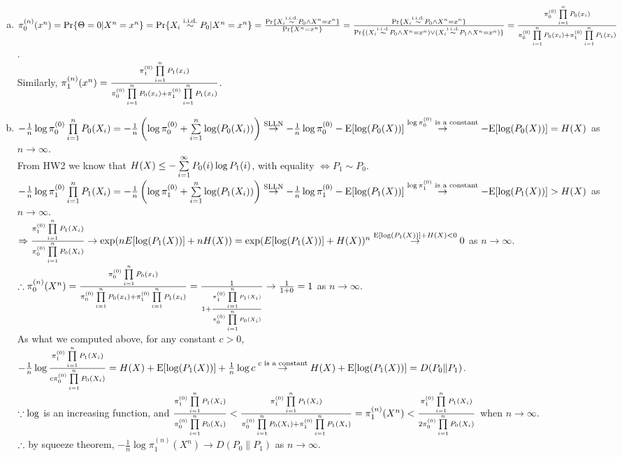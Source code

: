 \begin{pr}$ $
\begin{enumerate}[(a)]
\item $\pi_0^{(n)}(x^n)=\mathrm{Pr}\{\Theta=0|X^n=x^n\}=\mathrm{Pr}\{X_i\overset{\text{i.i.d.}}\sim P_0|X^n=x^n\}=\frac{\mathrm{Pr}\{X_i\overset{\text{i.i.d.}}\sim P_0\land X^n=x^n\}}{\mathrm{Pr}\{X^n=x^n\}}=\frac{\mathrm{Pr}\{X_i\overset{\text{i.i.d.}}\sim P_0\land X^n=x^n\}}{\mathrm{Pr}\{(X_i\overset{\text{i.i.d.}}\sim P_0\land X^n=x^n)\lor(X_i\overset{\text{i.i.d.}}\sim P_1\land X^n=x^n)\}}=\frac{\pi_0^{(0)}\prod\limits_{i=1}^nP_0(x_i)}{\pi_0^{(0)}\prod\limits_{i=1}^nP_0(x_i)+\pi_1^{(0)}\prod\limits_{i=1}^nP_1(x_i)}$.\\
Similarly, $\pi_1^{(n)}(x^n)=\frac{\pi_1^{(0)}\prod\limits_{i=1}^nP_1(x_i)}{\pi_0^{(0)}\prod\limits_{i=1}^nP_0(x_i)+\pi_1^{(0)}\prod\limits_{i=1}^nP_1(x_i)}$.
\item $-\frac1n\log\pi_0^{(0)}\prod\limits_{i=1}^nP_0(X_i)=-\frac1n\left(\log\pi_0^{(0)}+\sum\limits_{i=1}^n\log(P_0(X_i))\right)\overset{\text{SLLN}}\to-\frac1n\log\pi_0^{(0)}-\mathrm{E}[\log(P_0(X))]\overset{\log\pi_0^{(0)}\text{ is a constant}}\to-\mathrm{E}[\log(P_0(X))]=H(X)$ as $n\to\infty$.\\
From HW2 we know that $H(X)\leq-\sum\limits_{i=1}^\infty P_0(i)\log P_1(i)$, with equality $\iff P_1\sim P_0$.\\
$-\frac1n\log\pi_1^{(0)}\prod\limits_{i=1}^nP_1(X_i)=-\frac1n\left(\log\pi_1^{(0)}+\sum\limits_{i=1}^n\log(P_1(X_i))\right)\overset{\text{SLLN}}\to-\frac1n\log\pi_1^{(0)}-\mathrm{E}[\log(P_1(X))]\overset{\log\pi_1^{(0)}\text{ is a constant}}\to-\mathrm{E}[\log(P_1(X))]>H(X)$ as $n\to\infty$.\\
$\Rightarrow\frac{\pi_1^{(0)}\prod\limits_{i=1}^nP_1(X_i)}{\pi_0^{(0)}\prod\limits_{i=1}^nP_0(X_i)}\to\exp(nE[\log(P_1(X))]+nH(X))=\exp(E[\log(P_1(X))]+H(X))^n\overset{\mathrm{E}[\log(P_1(X))]+H(X)<0}\to0$ as $n\to\infty$.\\
$\therefore\pi_0^{(n)}(X^n)=\frac{\pi_0^{(0)}\prod\limits_{i=1}^nP_0(x_i)}{\pi_0^{(0)}\prod\limits_{i=1}^nP_0(x_i)+\pi_1^{(0)}\prod\limits_{i=1}^nP_1(x_i)}=\frac1{1+\frac{\pi_1^{(0)}\prod\limits_{i=1}^nP_1(X_i)}{\pi_0^{(0)}\prod\limits_{i=1}^nP_0(X_i)}}\to\frac1{1+0}=1$ as $n\to\infty$.\\
As what we computed above, for any constant $c>0$, $-\frac1n\log\frac{\pi_1^{(0)}\prod\limits_{i=1}^nP_1(X_i)}{c\pi_0^{(0)}\prod\limits_{i=1}^nP_0(X_i)}\\
=H(X)+\mathrm{E}[\log(P_1(X))]+\frac1n\log c\overset{c\text{ is a constant}}\to H(X)+\mathrm{E}[\log(P_1(X))]=D(P_0\|P_1)$.\\
$\because\log$ is an increasing function, and $\frac{\pi_1^{(0)}\prod\limits_{i=1}^nP_1(X_i)}{\pi_0^{(0)}\prod\limits_{i=1}^nP_0(X_i)}<\frac{\pi_1^{(0)}\prod\limits_{i=1}^nP_1(X_i)}{\pi_0^{(0)}\prod\limits_{i=1}^nP_0(X_i)+\pi_1^{(0)}\prod\limits_{i=1}^nP_1(X_i)}\\
=\pi_1^{(n)}(X^n)<\frac{\pi_1^{(0)}\prod\limits_{i=1}^nP_1(X_i)}{2\pi_0^{(0)}\prod\limits_{i=1}^nP_0(X_i)}$ when $n\to\infty$.\\
$\therefore$ by squeeze theorem, $-\frac1n\log\pi_1^{(n)}(X^n)\to D(P_0\|P_1)$ as $n\to\infty$.
\end{enumerate}
\end{pr}
